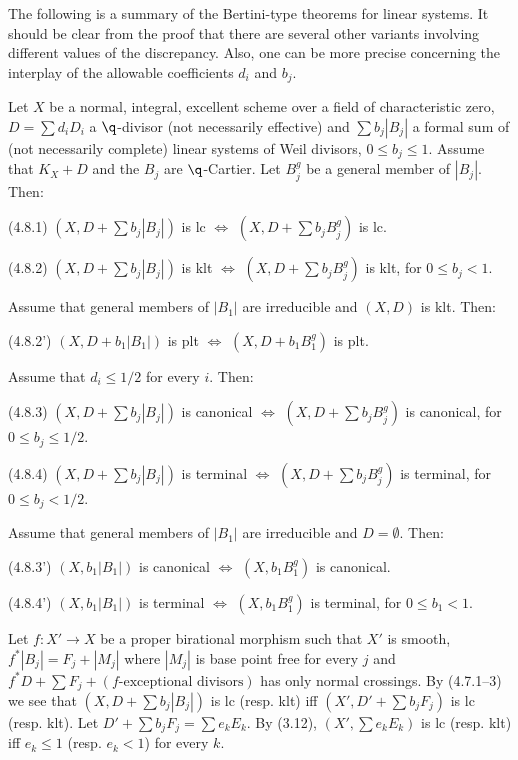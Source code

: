 The following is a summary of the  Bertini-type  theorems for linear
systems. It should be clear from the proof that there are several other variants
involving different values of the discrepancy. Also, one can be more precise
concerning the interplay of the allowable coefficients $d_i$ and $b_j$.



  Let $X$ be a normal, integral, excellent scheme over a
field of characteristic zero, 
$D=\sum d_iD_i$ a
$\q$-divisor (not necessarily effective) and $\sum b_j|B_j|$ a formal sum of
(not necessarily complete)  linear systems of Weil divisors, $0\leq b_j\leq 1$. 
Assume that
$K_X+D$ and the $B_j$ are
$\q$-Cartier. Let $B_j^g$ be a general member of $|B_j|$. Then:

(4.8.1) $(X,D+\sum b_j|B_j|)$ is lc $\Leftrightarrow$  $(X,D+\sum b_jB_j^g)$
 is lc.

(4.8.2)  $(X,D+\sum b_j|B_j|)$ is klt $\Leftrightarrow$ 
$(X,D+\sum b_jB_j^g)$ is klt, for $0\leq b_j<1$. 

\noindent Assume   that   general members of $|B_1|$ are irreducible
and $(X,D)$ is klt. Then: 

(4.8.2')  $(X,D+ b_1|B_1|)$ is
plt  $\Leftrightarrow$ 
$(X,D+b_1B_1^g)$ is plt. 

\noindent Assume   that   $d_i\leq 1/2$ for every $i$. Then:

(4.8.3)  $(X,D+\sum b_j|B_j|)$ is
canonical  $\Leftrightarrow$ 
$(X,D+\sum b_jB_j^g)$ is canonical, for $0\leq b_j\leq 1/2$. 


(4.8.4)  $(X,D+\sum b_j|B_j|)$ is
terminal  $\Leftrightarrow$ 
$(X,D+\sum b_jB_j^g)$ is terminal, for $0\leq b_j< 1/2$. 

\noindent Assume   that   general members of $|B_1|$ are irreducible
and $D=\emptyset$. Then: 

(4.8.3')  $(X, b_1|B_1|)$ is
canonical  $\Leftrightarrow$ 
$(X,b_1B_1^g)$ is canonical. 

(4.8.4')  $(X, b_1|B_1|)$ is
terminal  $\Leftrightarrow$ 
$(X, b_1B_1^g)$ is terminal, for $0\leq b_1< 1$. 
\endproclaim

\demop Let $f:X'\to X$ be a proper birational morphism
such that $X'$ is smooth, $f^*|B_j|=F_j+|M_j|$ where $|M_j|$ is base point free
for every $j$ and $f^*D+\sum F_j+(f\text{-exceptional divisors})$ has only normal
crossings.  By (4.7.1--3) we see that 
$(X,D+\sum b_j|B_j|)$ is lc (resp. klt) iff 
$(X',D'+\sum b_jF_j)$ is lc (resp. klt).  Let $D'+\sum b_jF_j=\sum e_kE_k$.
By (3.12), $(X',\sum e_kE_k)$ is lc (resp. klt) iff $e_k\leq 1$ 
(resp. $e_k< 1$) for every $k$. 

